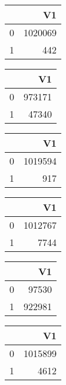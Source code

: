 \bigskip\bigskip
\centering
\begin{tabular}{rr}
  \hline
 & V1 \\ 
  \hline
0 & 1020069 \\ 
  1 & 442 \\ 
   \hline
\end{tabular}

\bigskip\bigskip
\centering
\begin{tabular}{rr}
  \hline
 & V1 \\ 
  \hline
0 & 973171 \\ 
  1 & 47340 \\ 
   \hline
\end{tabular}

\bigskip\bigskip
\centering
\begin{tabular}{rr}
  \hline
 & V1 \\ 
  \hline
0 & 1019594 \\ 
  1 & 917 \\ 
   \hline
\end{tabular}

\bigskip\bigskip
\centering
\begin{tabular}{rr}
  \hline
 & V1 \\ 
  \hline
0 & 1012767 \\ 
  1 & 7744 \\ 
   \hline
\end{tabular}

\bigskip\bigskip
\centering
\begin{tabular}{rr}
  \hline
 & V1 \\ 
  \hline
0 & 97530 \\ 
  1 & 922981 \\ 
   \hline
\end{tabular}

\bigskip\bigskip
\centering
\begin{tabular}{rr}
  \hline
 & V1 \\ 
  \hline
0 & 1015899 \\ 
  1 & 4612 \\ 
   \hline
\end{tabular}


